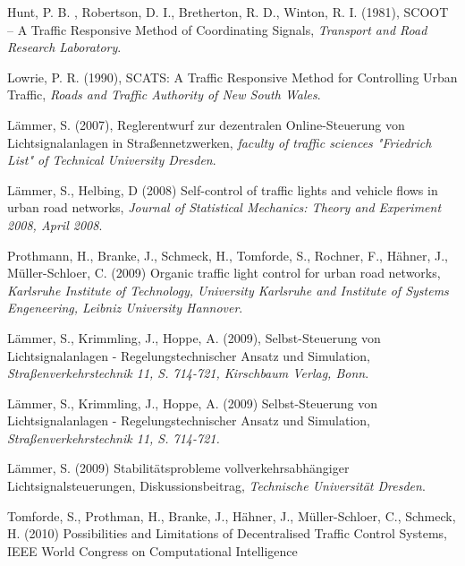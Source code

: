 \begin{thebibliography}{1}

    
    Hunt, P. B. , Robertson, D. I., Bretherton, R. D., Winton, R. I. (1981), SCOOT – A Traffic Responsive
    Method of Coordinating Signals, \emph{Transport and Road Research Laboratory}.
    
    Lowrie, P. R. (1990), SCATS: A Traffic Responsive Method for Controlling Urban Traffic, \emph{Roads and
    Traffic Authority of New South Wales}.

    L\"ammer, S. (2007), Reglerentwurf zur dezentralen Online-Steuerung von Lichtsignalanlagen in Straßennetzwerken, \emph{faculty of traffic sciences "Friedrich List" of Technical University Dresden}.
    
    L\"ammer, S., Helbing, D (2008) Self-control of traffic lights and vehicle flows in urban road networks, \emph{ Journal of Statistical Mechanics: Theory and Experiment 2008, April 2008}.
    
    Prothmann, H., Branke, J., Schmeck, H., Tomforde, S., Rochner, F., H\"ahner, J., Müller-Schloer, C. (2009) Organic traffic light control for urban road networks, \emph{Karlsruhe Institute of Technology, University Karlsruhe and Institute of Systems Engeneering, Leibniz University Hannover}.
    
    L\"ammer, S., Krimmling, J., Hoppe, A. (2009), Selbst-Steuerung von Lichtsignalanlagen - Regelungstechnischer Ansatz und Simulation, \emph{Stra{\ss}enverkehrstechnik 11, S. 714-721, Kirschbaum Verlag, Bonn}.
    
     Lämmer, S., Krimmling, J., Hoppe, A. (2009) Selbst-Steuerung von Lichtsignalanlagen - Regelungstechnischer Ansatz und Simulation, \emph{Straßenverkehrstechnik 11, S. 714-721.}
    
    Lämmer, S. (2009) Stabilit\"atsprobleme vollverkehrsabhängiger Lichtsignalsteuerungen, Diskussionsbeitrag, \emph{Technische Universität Dresden}.
    
    Tomforde, S., Prothman, H., Branke, J., H\"ahner, J., M\"uller-Schloer, C., Schmeck, H. (2010) Possibilities and Limitations of Decentralised Traffic Control Systems, IEEE World Congress on Computational Intelligence
    

\end{thebibliography}
